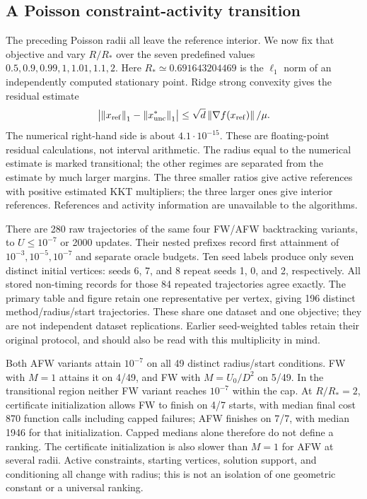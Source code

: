 \subsection{A Poisson constraint-activity transition}
\label{sec:transition}
The preceding Poisson radii all leave the reference interior. We now fix
that objective and vary $R/R_*$ over the seven predefined values
$0.5,0.9,0.99,1,1.01,1.1,2$. Here $R_*\simeq0.691643204469$ is the
$\ell_1$ norm of an independently computed stationary point. Ridge
strong convexity gives the residual estimate
\[
 \bigl|\left\|x_{\rm ref}\right\|_1-\left\|x^*_{\rm unc}\right\|_1\bigr|
 \le \sqrt d\left\|\nabla f(x_{\rm ref})\right\|/\mu.
\]
The numerical right-hand side is about $4.1\cdot10^{-15}$.
These are floating-point residual calculations, not interval arithmetic.
The radius equal to the numerical estimate is marked transitional;
the other regimes are separated from the estimate by much larger margins.
The three smaller ratios give active references with positive estimated
KKT multipliers; the three larger ones give interior references.
References and activity information are unavailable to the algorithms.

There are 280 raw trajectories of the same four FW/AFW backtracking
variants, to $U\le10^{-7}$ or 2000 updates. Their nested prefixes record
first attainment of $10^{-3},10^{-5},10^{-7}$ and separate oracle
budgets. Ten seed labels produce only seven distinct initial vertices:
seeds 6, 7, and 8 repeat seeds 1, 0, and 2, respectively. All stored
non-timing records for those 84 repeated trajectories agree exactly.
The primary table and figure retain one representative per vertex,
giving 196 distinct method/radius/start trajectories. These share
one dataset and one objective; they are not independent dataset
replications. Earlier seed-weighted tables retain their original
protocol, and should also be read with this multiplicity in mind.

Both AFW variants attain $10^{-7}$ on all 49 distinct radius/start
conditions. FW with $M=1$ attains it on 4/49, and FW with $M=U_0/D^2$
on 5/49. In the transitional region neither FW variant reaches
$10^{-7}$ within the cap. At $R/R_*=2$, certificate initialization
allows FW to finish on 4/7 starts, with median final cost 870 function
calls including capped failures; AFW finishes on 7/7, with median 1946
for that initialization. Capped medians alone therefore do not define
a ranking. The certificate initialization is also slower than $M=1$
for AFW at several radii. Active constraints, starting vertices,
solution support, and conditioning all change with radius; this is
not an isolation of one geometric constant or a universal ranking.

